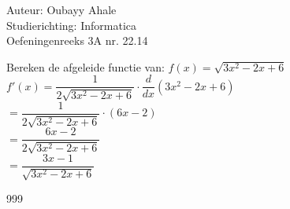 \documentclass[a4paper]{article}
\begin{document}
  
\noindent \large Auteur: Oubayy Ahale          \\
\noindent \large Studierichting: Informatica   \\
\noindent \large Oefeningenreeks 3A nr. 22.14  \\

\medskip

\normalsize

Bereken de afgeleide functie van: $ f(x) = \sqrt{3x^2 - 2x + 6} $\\

$ f'(x) = \dfrac{1}{2 \sqrt{3x^2 - 2x + 6}} \cdot \dfrac{d}{dx} (3x^2 - 2x + 6) $\\

$ = \dfrac{1}{2 \sqrt{3x^2 - 2x + 6}} \cdot (6x - 2) $\\

$ = \dfrac{6x - 2}{2 \sqrt{3x^2 - 2x + 6}} $\\

$ = \dfrac{3x - 1}{\sqrt{3x^2 - 2x + 6}} $\\

\begin{thebibliography}{999}
\end{thebibliography}
\end{document}
